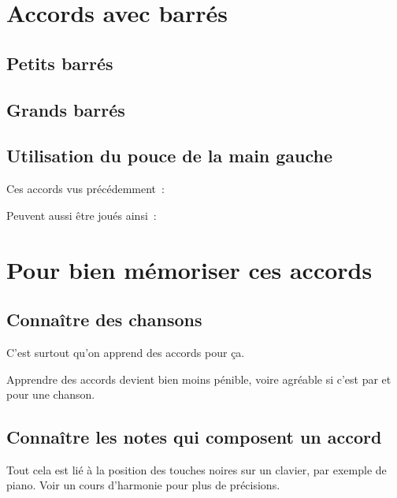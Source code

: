 \documentclass[11pt]{article}
\begin{document}
\section{Accords avec barrés}

\subsection{Petits barrés}


\subsection{Grands barrés}

\hspace{3em}

\subsection{Utilisation du pouce de la main gauche}

Ces accords vus précédemment~:


Peuvent aussi être joués ainsi~:


\section{Pour bien mémoriser ces accords}

\subsection{Connaître des chansons}

C’est surtout qu’on apprend des accords pour ça.

Apprendre des accords devient bien moins pénible, voire agréable si c’est
par et pour une chanson.

\subsection{Connaître les notes qui composent un accord}

Tout cela est lié à la position des touches noires sur un clavier, par exemple
de piano. Voir un cours d’harmonie pour plus de précisions.
\end{document}
